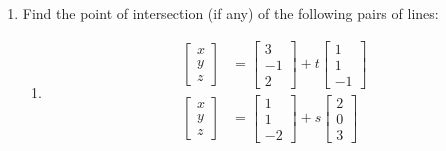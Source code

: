 \documentclass[letterpaper,12pt]{article}
\newcommand{\R}{\mathbb{R}}
\begin{document}
\begin{enumerate}
\begin{enumerate}
{\bf Proof:} The proof is similar to the one given above: if we let $\vec{x}=\begin{bmatrix}x_1&\cdots &x_n\end{bmatrix}^T$, then the equation $A\vec{x}=\vec{y}$ is equivalent to the equation
\[
 x_1C_1+x_2C_2+\cdots+x_nC_n=\vec{y}.
\]
Therefore, given $\vec{y}\in\R^m$, if $A\vec{x}=\vec{y}$ has a solution $\vec{x}$, then we can find scalars $x_1,\ldots, x_n$ such that $x_1C_1+\cdots +x_nC_n=\vec{y}$, and thus $\vec{y}$ is in the span of the columns $C_1,\ldots, C_n$.

Conversely, if $\vec{y}\in\operatorname{span}\{C_1,\ldots, C_n\}$, then there exist scalars $x_1,\ldots, x_n$ such that $x_1C_1+\cdots+x_nC_n=\vec{y}$, and thus $A\vec{x}=\vec{y}$ has a solution.
\end{enumerate}

\bigskip

\item Find the point of intersection (if any) of the following pairs of lines:
\begin{enumerate}
 \item \begin{align*}
        \begin{bmatrix}x\\y\\z\end{bmatrix} & = \begin{bmatrix}3\\-1\\2\end{bmatrix}+t\begin{bmatrix}1\\1\\-1\end{bmatrix}\\
        \begin{bmatrix}x\\y\\z\end{bmatrix} & = \begin{bmatrix}1\\1\\-2\end{bmatrix}+s\begin{bmatrix}2\\0\\3\end{bmatrix}\\
       \end{align*}


\end{enumerate}
\end{enumerate}
\end{document}

